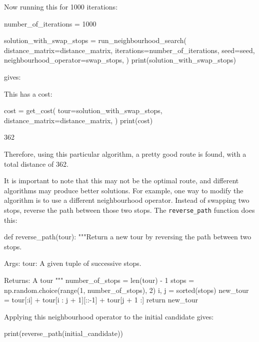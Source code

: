 Now running this for 1000 iterations:

\begin{pyin}
number_of_iterations = 1000

solution_with_swap_stops = run_neighbourhood_search(
    distance_matrix=distance_matrix,
    iterations=number_of_iterations,
    seed=seed,
    neighbourhood_operator=swap_stops,
)
print(solution_with_swap_stops)
\end{pyin}

gives:

\begin{pyout}
[0, 7, 2, 8, 5, 3, 1, 9, 12, 11, 4, 10, 6, 0]
\end{pyout}

This has a cost:

\begin{pyin}
cost = get_cost(
    tour=solution_with_swap_stops,
    distance_matrix=distance_matrix,
)
print(cost)
\end{pyin}

\begin{pyout}
362
\end{pyout}

Therefore, using this particular algorithm, a pretty good route is found, with a
total distance of 362.

It is important to note that this may not be the optimal route, and different algorithms
may produce better solutions.
For example, one way to modify the algorithm is to use a different neighbourhood operator.
Instead of swapping two stops, reverse the path between those two
stops. The \texttt{reverse_path} function does this:

\begin{pyin}
def reverse_path(tour):
    """Return a new tour by reversing the path between two stops.

    Args:
        tour: A given tuple of successive stops.

    Returns:
        A tour
    """
    number_of_stops = len(tour) - 1
    stops = np.random.choice(range(1, number_of_stops), 2)
    i, j = sorted(stops)
    new_tour = tour[:i] + tour[i : j + 1][::-1] + tour[j + 1 :]
    return new_tour
\end{pyin}

Applying this neighbourhood operator to the initial candidate gives:

\begin{pyin}
print(reverse_path(initial_candidate))
\end{pyin}

